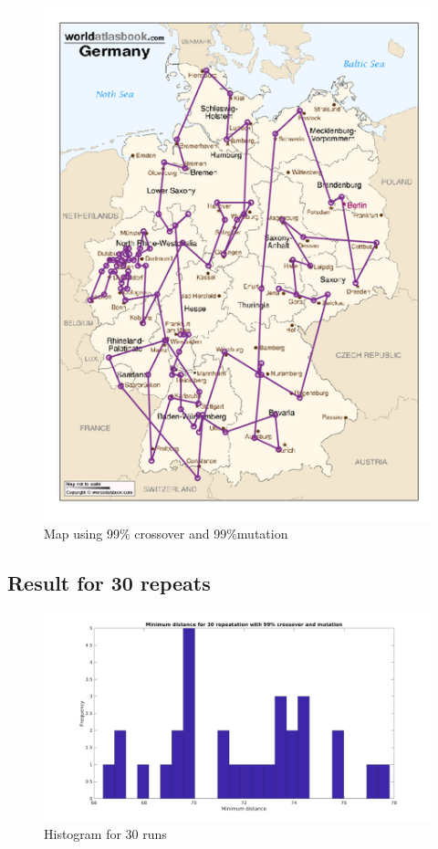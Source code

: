 \documentclass[a4paper, 12pt]{article}
\begin{document}
\begin{figure}[ht!]
  \centering
  \includegraphics[width=1.0\textwidth]{images/resultmap-mine-crop}
    \caption{Map using 99\% crossover and 99\%mutation \label{fig:xxx1}}
\end{figure}

\subsection{Result for 30 repeats}


\begin{figure}[ht!]
	\centering
	\includegraphics[width=1.0\textwidth]{images/histogram}
	\caption{Histogram for 30 runs \label{fig:mutfig}}
\end{figure}
\end{document}
